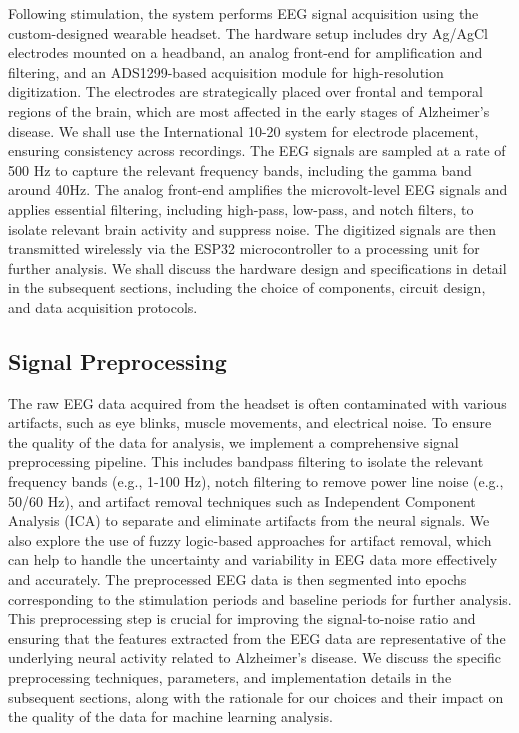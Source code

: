 \documentclass[openany]{book}
\begin{document}
Following stimulation, the system performs EEG signal acquisition using the custom-designed wearable headset. The hardware setup includes dry Ag/AgCl electrodes mounted on a headband, an analog front-end for amplification and filtering, and an ADS1299-based acquisition module for high-resolution digitization. The electrodes are strategically placed over frontal and temporal regions of the brain, which are most affected in the early stages of Alzheimer's disease. We shall use the International 10-20 system for electrode placement, ensuring consistency across recordings. The EEG signals are sampled at a rate of 500 Hz to capture the relevant frequency bands, including the gamma band around 40Hz. The analog front-end amplifies the microvolt-level EEG signals and applies essential filtering, including high-pass, low-pass, and notch filters, to isolate relevant brain activity and suppress noise. The digitized signals are then transmitted wirelessly via the ESP32 microcontroller to a processing unit for further analysis. We shall discuss the hardware design and specifications in detail in the subsequent sections, including the choice of components, circuit design, and data acquisition protocols.  \\
\subsection{Signal Preprocessing}
The raw EEG data acquired from the headset is often contaminated with various artifacts, such as eye blinks, muscle movements, and electrical noise. To ensure the quality of the data for analysis, we implement a comprehensive signal preprocessing pipeline. This includes bandpass filtering to isolate the relevant frequency bands (e.g., 1-100 Hz), notch filtering to remove power line noise (e.g., 50/60 Hz), and artifact removal techniques such as Independent Component Analysis (ICA) to separate and eliminate artifacts from the neural signals. We also explore the use of fuzzy logic-based approaches for artifact removal, which can help to handle the uncertainty and variability in EEG data more effectively and accurately. The preprocessed EEG data is then segmented into epochs corresponding to the stimulation periods and baseline periods for further analysis. This preprocessing step is crucial for improving the signal-to-noise ratio and ensuring that the features extracted from the EEG data are representative of the underlying neural activity related to Alzheimer's disease. We discuss the specific preprocessing techniques, parameters, and implementation details in the subsequent sections, along with the rationale for our choices and their impact on the quality of the data for machine learning analysis. \\
\end{document}
